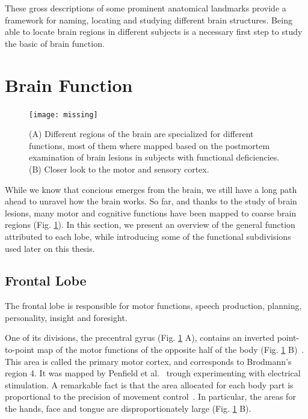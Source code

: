 These gross descriptions of some prominent anatomical landmarks provide a
framework for naming, locating and studying different brain structures. Being
able to locate brain regions in different subjects is a necessary first step
to study the basic of brain function.

\section{Brain Function}

\begin{figure}[t]
    \texttt{[image: missing]}
    \caption{(A) Different regions of the brain are specialized for different
             functions, most of them where mapped based on the postmortem 
             examination of brain lesions in subjects with functional
             deficiencies. (B) Closer look to the motor and sensory cortex.}
    \label{fig:brain_function}
\end{figure}


While we know that concious emerges from the brain, we still have a long path
ahead to unravel how the brain works. So far, and thanks to the study of
brain lesions, many motor and cognitive functions have been mapped to coarse
brain regions (Fig. \ref{fig:brain_function}). In this section, we present an
overview of the general function attributed to each lobe, while introducing 
some of the functional subdivisions used later on this thesis.

\subsection{Frontal Lobe}
The frontal lobe is responsible for motor functions, speech production, 
planning, personality, insight and foresight.

One of its divisions, the precentral gyrus (Fig. \ref{fig:brain_function} A),
contains an inverted point-to-point map of the motor functions of the opposite
half of the body (Fig. \ref{fig:brain_function} B)~\cite{Johns, Purves2004,
Catani2012}. This area is called the primary motor cortex, and corresponds to
Brodmann's region 4. It was mapped by Penfield et al.~\cite{Penfield1954} trough
experimenting with electrical stimulation. A remarkable fact is that the area
allocated for each body part is proportional to the precision of movement
control~\cite{Johns}. In particular, the areas for the hands, face and tongue
are disproportionately large (Fig. \ref{fig:brain_function} B).

